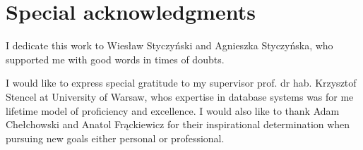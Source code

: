 \vspace*{0.18\textheight}
\begingroup
\centering
{}
\section*{\centering{}\selectfont Special acknowledgments}

I dedicate this work to Wiesław Styczyński and Agnieszka Styczyńska, who supported me with good words in times of doubts.

\medskip
I would like to express special gratitude to my supervisor prof. dr hab. Krzysztof Stencel at University of Warsaw, whos expertise in database systems was for me lifetime model of proficiency and excellence.
I would also like to thank Adam Chełchowski and Anatol Frąckiewicz for their inspirational determination when pursuing new goals either personal or professional.
\par
\endgroup
\vfill
